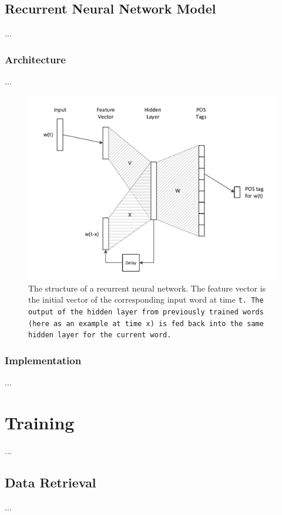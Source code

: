 \section{Recurrent Neural Network Model}\label{c.postagging.rnn}
...

\subsection{Architecture}\label{c.postagging.rnn.architecture}
...
\begin{figure}[H]
	\includegraphics[width=\textwidth]{images/rnn_structure}
	\caption[Structure of a Recurrent Neural Network]{The structure of a recurrent neural network. The feature vector is the initial vector of the corresponding input word at time \tt{t}. The output of the hidden layer from previously trained words (here as an example at time \tt{x}) is fed back into the same hidden layer for the current word.}
	\label{f.rnn_structure}
\end{figure}

\subsection{Implementation}\label{c.postagging.rnn.implementation}
...

\chapter{Training}\label{c.training}
...

\section{Data Retrieval}\label{c.training.data}
...

